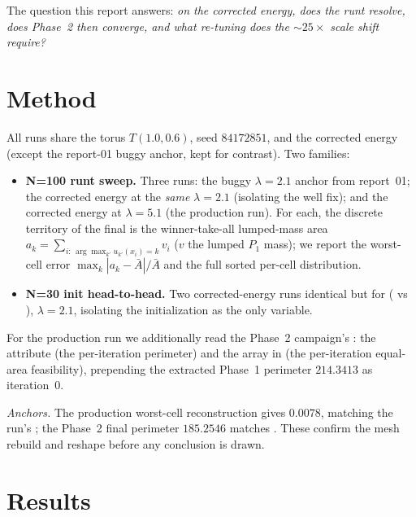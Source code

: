 \documentclass[11pt,a4paper]{article}
\begin{document}
The question this report answers: \emph{on the corrected energy, does the runt
resolve, does Phase~2 then converge, and what re-tuning does the \(\sim\!25\times\)
scale shift require?}

\section{Method}
All runs share the torus \(T(1.0,0.6)\), seed \(84172851\), and the corrected energy
(except the report-01 buggy anchor, kept for contrast). Two families:

\begin{itemize}[leftmargin=1.4em]
\item \textbf{N=100 runt sweep.} Three runs: the buggy \(\lambda{=}2.1\) anchor from
  report~01; the corrected energy at the \emph{same} \(\lambda{=}2.1\) (isolating the
  well fix); and the corrected energy at \(\lambda{=}5.1\) (the production run).
  For each, the discrete territory of the final  is the winner-take-all
  lumped-mass area \(a_k=\sum_{i:\,\arg\max_{k'} u_{k'}(x_i)=k} v_i\) (\(v\) the lumped
  \(P_1\) mass); we report the worst-cell error \(\max_k|a_k-\bar A|/\bar A\) and the
  full sorted per-cell distribution.
\item \textbf{N=30 init head-to-head.} Two corrected-energy runs identical but for
   ( vs ), \(\lambda{=}2.1\), isolating
  the initialization as the only variable.
\end{itemize}

For the production run we additionally read the Phase~2 campaign's :
the  attribute (the per-iteration perimeter) and the
 array in  (the per-iteration
equal-area feasibility), prepending the extracted Phase~1 perimeter \(214.3413\) as
iteration~0.

\emph{Anchors.} The production worst-cell reconstruction gives \(0.0078\), matching
the run's  ; the Phase~2
final perimeter \(185.2546\) matches . These confirm the mesh
rebuild and reshape before any conclusion is drawn.

\section{Results}
\end{document}
